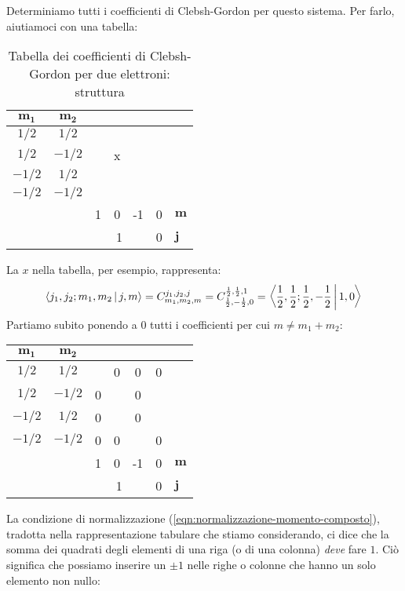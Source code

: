\documentclass[../../FisicaTeorica.tex]{subfiles}
\begin{document}
Determiniamo tutti i coefficienti di Clebsh-Gordon per questo sistema. Per farlo, aiutiamoci con una tabella:
\begin{table}[H]
\centering
\begin{tabular}{@{}cccccc|l@{}}
\toprule
$\bm{m_1}$ & \multicolumn{1}{c|}{$\bm{m_2}$} &  &  &  &  &  \\ \midrule
$1/2$ & \multicolumn{1}{c|}{$1/2$} &  &  &  &  &  \\
$1/2$ & \multicolumn{1}{c|}{$-1/2$} &  & x &  &  &  \\
$-1/2$ & \multicolumn{1}{c|}{$1/2$} &  &  &  &  &  \\
$-1/2$ & \multicolumn{1}{c|}{$-1/2$} &  &  &  &  &  \\ \midrule
 &  & 1 & 0 & -1 & 0 & $\bm{m}$ \\
 &  & \multicolumn{3}{c}{1} & 0 & $\bm{j}$ \\ \bottomrule
\end{tabular}
\caption{Tabella dei coefficienti di Clebsh-Gordon per due elettroni: struttura}
\label{tab:clebsh-gordon-1}
\end{table}
La $x$ nella tabella, per esempio, rappresenta:
\begin{align*}
\Braket{j_1, j_2; m_1, m_2|j,m}=
C^{j_1, j_2, j}_{m_1, m_2, m} = C^{\frac{1}{2},\frac{1}{2},1}_{\frac{1}{2}, -\frac{1}{2},0} = \Braket{\frac{1}{2}, \frac{1}{2}; \frac{1}{2},-\frac{1}{2}|1,0}
\end{align*}
Partiamo subito ponendo a $0$ tutti i coefficienti per cui $m\neq m_1+m_2$:
\begin{table}[H]
\centering
\begin{tabular}{@{}cccccc|l@{}}
\toprule
$\bm{m_1}$ & \multicolumn{1}{c|}{$\bm{m_2}$} &  &  &  &  &  \\ \midrule
$1/2$ & \multicolumn{1}{c|}{$1/2$} &  & 0 & 0 & 0 &  \\
$1/2$ & \multicolumn{1}{c|}{$-1/2$} & 0  &  & 0 &  &  \\
$-1/2$ & \multicolumn{1}{c|}{$1/2$} & 0 &  & 0 &  &  \\
$-1/2$ & \multicolumn{1}{c|}{$-1/2$} & 0 & 0 &  & 0 &  \\ \midrule
 &  & 1 & 0 & -1 & 0 & $\bm{m}$ \\
 &  & \multicolumn{3}{c}{1} & 0 & $\bm{j}$ \\ \bottomrule
\end{tabular}
\label{tab:clebsh-gordon-2}
\end{table}
La condizione di normalizzazione (\ref{eqn:normalizzazione-momento-composto}), tradotta nella rappresentazione tabulare che stiamo considerando, ci dice che la somma dei quadrati degli elementi di una riga (o di una colonna) \textit{deve} fare $1$. Ciò significa che possiamo inserire un $\pm 1$ nelle righe o colonne che hanno un solo elemento non nullo:
\end{document}
